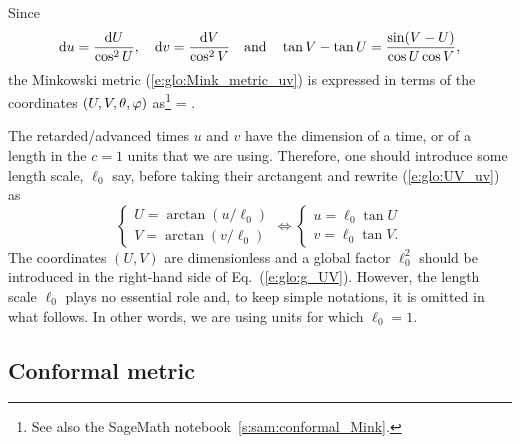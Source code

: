Since
\[
    \mathrm{d} u = \frac{\mathrm{d} U}{\cos^2 U}, \quad \mathrm{d} v = \frac{\mathrm{d} V}{\cos^2 V}
    \quad\mbox{and}\quad
    \tan V - \tan U = \frac{\sin(V-U)}{\cos U \cos V},
\]
the Minkowski metric (\ref{e:glo:Mink_metric_uv})
is expressed in terms of the coordinates $(U,V,\theta,\varphi)$
as\footnote{See also the SageMath notebook~\ref{s:sam:conformal_Mink}.}
\be \label{e:glo:g_UV}
     = 
     .
\ee

\begin{remark}
The retarded/advanced times $u$ and $v$ have the dimension of a time, or of a
length in the $c=1$ units that we are using. Therefore, one should introduce
some length scale, $\ell_0$ say, before taking their arctangent and rewrite
(\ref{e:glo:UV_uv}) as
\[
    \left\{ \begin{array}{l}
    U = \arctan (u/\ell_0) \\
    V = \arctan (v/\ell_0)
    \end{array} \right.
    \iff
   \left\{ \begin{array}{l}
    u = \ell_0 \tan U \\
    v = \ell_0 \tan V .
    \end{array} \right.
\]
The coordinates $(U,V)$ are dimensionless and a global factor $\ell_0^2$ should be
introduced in the right-hand side of Eq.~(\ref{e:glo:g_UV}).
However, the length scale $\ell_0$ plays no essential role and, to keep simple notations,
it is omitted in what follows. In other words, we are using units for
which $\ell_0=1$.
\end{remark}

\subsection{Conformal metric} \label{s:glo:conf_metric}

